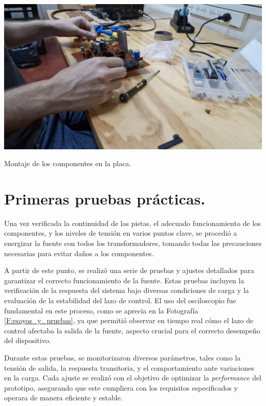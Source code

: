 \begin{foto}[htbp]
    \centering
    \includegraphics[width=\textwidth]{./imagenes/fotos/montaje.jpg}
    \caption{Montaje de los componentes en la placa.}
    \label{F:montaje_componentes}
\end{foto} \par 

\section{Primeras pruebas prácticas.}
Una vez verificada la continuidad de las pistas, el adecuado funcionamiento de los componentes, y los niveles de tensión en varios puntos clave, se procedió a energizar la fuente con todos los transformadores, tomando todas las precauciones necesarias para evitar daños a los componentes.\par 
A partir de este punto, se realizó una serie de pruebas y ajustes detallados para garantizar el correcto funcionamiento de la fuente. Estas pruebas incluyen la verificación de la respuesta del sistema bajo diversas condiciones de carga y la evaluación de la estabilidad del lazo de control. El uso del osciloscopio fue fundamental en este proceso, como se aprecia en la Fotografía \ref{F:esayos_y_pruebas}, ya que permitió observar en tiempo real cómo el lazo de control afectaba la salida de la fuente, aspecto crucial para el correcto desempeño del dispositivo.\par 
Durante estas pruebas, se monitorizaron diversos parámetros, tales como la tensión de salida, la respuesta transitoria, y el comportamiento ante variaciones en la carga. Cada ajuste se realizó con el objetivo de optimizar la \textit{performance} del prototipo, asegurando que este cumpliera con los requisitos especificados y operara de manera eficiente y estable.\par 

